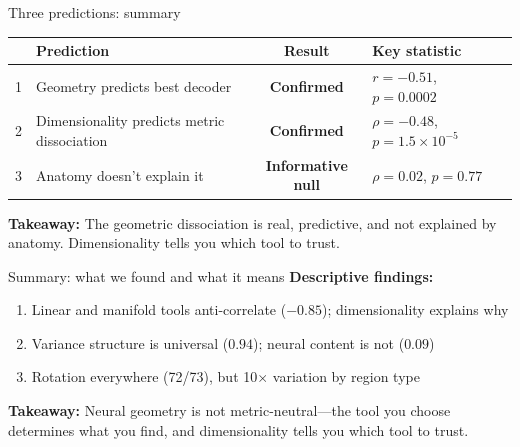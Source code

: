 \documentclass[aspectratio=169,11pt]{beamer}
\begin{document}
\begin{frame}{Three predictions: summary}

\begin{center}
{\small
\begin{tabular}{llcl}
\toprule
& \textbf{Prediction} & \textbf{Result} & \textbf{Key statistic} \\
\midrule
1 & Geometry predicts best decoder & \textcolor{pass}{\textbf{Confirmed}} & $r = -0.51$, $p = 0.0002$ \\[0.5em]
2 & Dimensionality predicts metric dissociation & \textcolor{pass}{\textbf{Confirmed}} & $\rho = -0.48$, $p = 1.5 \times 10^{-5}$ \\[0.5em]
3 & Anatomy doesn't explain it & \textcolor{pass}{\textbf{Informative null}} & $\rho = 0.02$, $p = 0.77$ \\
\bottomrule
\end{tabular}
}
\end{center}

\vspace{1em}

\textbf{Takeaway:} The geometric dissociation is real, predictive, and not explained by anatomy. Dimensionality tells you which tool to trust.

\end{frame}

\begin{frame}{Summary: what we found and what it means}
\textbf{Descriptive findings:}
\begin{enumerate}
  \item Linear and manifold tools anti-correlate ($-0.85$); dimensionality explains why
  \item Variance structure is universal ($0.94$); neural content is not ($0.09$)
  \item Rotation everywhere (72/73), but 10$\times$ variation by region type
\end{enumerate}

\vspace{0.5em}
{\small \textbf{Takeaway:} Neural geometry is not metric-neutral---the tool you choose determines what you find, and dimensionality tells you which tool to trust.}
\end{frame}

\end{document}
